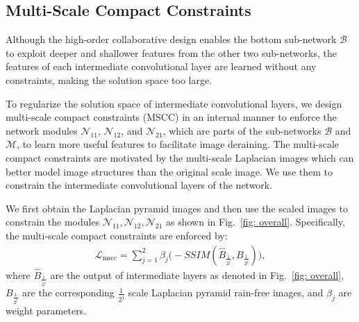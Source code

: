 \documentclass[letterpaper]{article} %
\newcommand{\JS} [1] {\textcolor{red}{[JS: #1]}}
\begin{document}
\subsection{Multi-Scale Compact Constraints}\label{sec: Multi-scale Compact Constraint}
%
Although the high-order collaborative design enables the bottom sub-network $\mathcal{B}$ to exploit deeper and shallower features from the other two sub-networks, the features of each intermediate convolutional layer are learned without any constraints, making the solution space too large.
%

To regularize the solution space of intermediate convolutional layers, we design multi-scale compact constraints (MSCC) in an internal manner to enforce the network modules $\mathcal{N}_{11}$, $\mathcal{N}_{12}$, and $\mathcal{N}_{21}$, which are parts of the sub-networks $\mathcal{B}$ and $\mathcal{M}$, to learn more useful features to facilitate image deraining.
%
The multi-scale compact constraints are motivated by the multi-scale Laplacian images which can better model image structures than the original scale image. We use them to constrain the intermediate convolutional layers of the network.
%

We first obtain the Laplacian pyramid images and then use the scaled images to
constrain the modules $\mathcal{N}_{11}, \mathcal{N}_{12},  \mathcal{N}_{21}$ as shown in Fig.~\ref{fig: overall}. Specifically,
%
the multi-scale compact constraints are enforced by:
\begin{equation}
\begin{array}{ll}
\mathcal{L}_{\text{mscc}} = \sum_{j=1}^{2}\beta_{j}\big(-SSIM(\hat{B}_{\frac{1}{2^{j}}}, B_{\frac{1}{2^{j}}})\big),
\end{array}
\label{eq:n0}
\end{equation}
where $\hat{B}_{\frac{1}{2^{j}}}$ are the output of intermediate layers as denoted in Fig.~\ref{fig: overall},
$B_{\frac{1}{2^{j}}}$ are the corresponding $\frac{1}{2^{j}}$ scale Laplacian pyramid rain-free images, and
$\beta_{j}$ are weight parameters.
%
\end{document}
